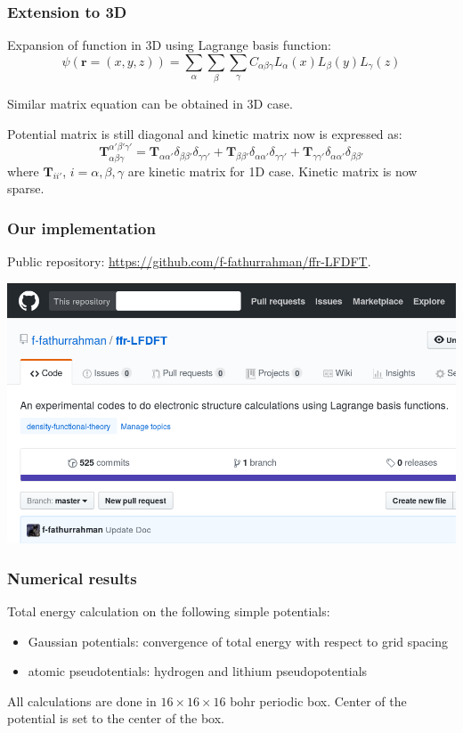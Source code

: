 \documentclass[10pt]{beamer}
\begin{document}
\begin{frame}
\frametitle{Extension to 3D}

Expansion of function in 3D using Lagrange basis function:
\begin{equation*}
\psi(\mathbf{r} = (x,y,z)) =
\sum_{\alpha}\sum_{\beta}\sum_{\gamma} C_{\alpha\beta\gamma}
L_{\alpha}(x) L_{\beta}(y) L_{\gamma}(z)
\end{equation*}

Similar matrix equation can be obtained in 3D case.

Potential matrix is still diagonal and kinetic matrix now is expressed as:
\begin{equation*}
\mathbf{T}_{\alpha\beta\gamma}^{\alpha'\beta'\gamma'} =
\mathbf{T}_{\alpha\alpha'}\delta_{\beta\beta'}\delta_{\gamma\gamma'} +
\mathbf{T}_{\beta\beta'}\delta_{\alpha\alpha'}\delta_{\gamma\gamma'} +
\mathbf{T}_{\gamma\gamma'}\delta_{\alpha\alpha'}\delta_{\beta\beta'}
\end{equation*}
where $\mathbf{T}_{ii'}$, $i=\alpha,\beta,\gamma$ are kinetic matrix for 1D case.
Kinetic matrix is now sparse.

\end{frame}

\begin{frame}
\frametitle{Our implementation}
  
Public repository: \url{https://github.com/f-fathurrahman/ffr-LFDFT}.
  
{\centering
\includegraphics[scale=0.25]{images/ffr-LFDFT-github-cropped.png}
\par}
  
\end{frame}
  

\begin{frame}
\frametitle{Numerical results}

Total energy calculation on the following simple potentials:
\begin{itemize}
\item Gaussian potentials: convergence of total energy with respect to
grid spacing
\item atomic pseudotentials: hydrogen and lithium pseudopotentials
\end{itemize}

All calculations are done in $16\times16\times16$ bohr periodic box.
Center of the potential is set to the center of the box.

\end{frame}
\end{document}

